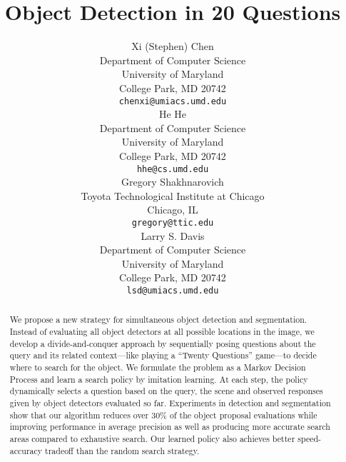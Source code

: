 \documentclass{article} %
\title{Object Detection in 20 Questions}
\author{
Xi (Stephen) Chen\\
Department of Computer Science\\
University of Maryland\\
College Park, MD 20742 \\
\texttt{chenxi@umiacs.umd.edu} \\
\AND
He He \\
Department of Computer Science\\
University of Maryland\\
College Park, MD 20742 \\
\texttt{hhe@cs.umd.edu} \\
\And
Gregory Shakhnarovich\\
Toyota Technological Institute at Chicago \\
Chicago, IL\\
\texttt{gregory@ttic.edu} \\
\And
Larry S. Davis \\
Department of Computer Science\\
University of Maryland\\
College Park, MD 20742 \\
\texttt{lsd@umiacs.umd.edu} 
}
\theoremstyle{definition}
\begin{document}
\maketitle

\begin{abstract}
We propose a new strategy for simultaneous object detection and segmentation. Instead of evaluating all object detectors at all possible locations in the
image, we develop a divide-and-conquer approach by sequentially posing questions about the query and its related context---like playing a ``Twenty Questions'' game---to decide where to search for the object. We formulate the problem as a Markov Decision Process and learn a search policy by imitation learning. At each step, the policy dynamically selects a question based on the query, the scene and observed responses given by object detectors evaluated so far.
Experiments in detection and segmentation show that our algorithm reduces over 30\% of the object proposal evaluations while improving performance in average precision as well as producing more accurate search areas compared to exhaustive search. Our learned policy also achieves better speed-accuracy tradeoff than the random search strategy. 
\end{abstract}












{\small


}
\end{document}
